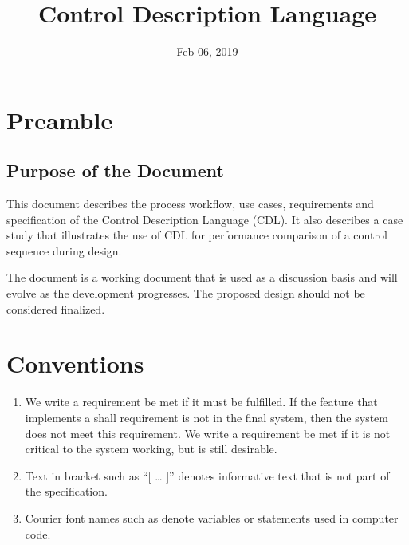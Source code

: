 \documentclass[letterpaper,10pt, openany,english]{sphinxmanual}
\title{Control Description Language}
\date{Feb 06, 2019}
\author{}
\begin{document}
\pagestyle{empty}
\sphinxmaketitle
\pagestyle{plain}
\sphinxtableofcontents
\pagestyle{normal}
\label{\detokenize{index::doc}}


\pagestyle{plain}


\chapter{Preamble}
\label{\detokenize{preample:preamble}}\label{\detokenize{preample::doc}}

\section{Purpose of the Document}
\label{\detokenize{preample:purpose-of-the-document}}
This document describes the process workflow,
use cases, requirements and
specification of the Control Description Language (CDL).
It also describes a case study that illustrates the use of CDL for
performance comparison of a control sequence during design.

The document is a working document that is used as a discussion basis
and will evolve as the development progresses. The proposed design
should not be considered finalized.


\chapter{Conventions}
\label{\detokenize{conventions:conventions}}\label{\detokenize{conventions:sec-conventions}}\label{\detokenize{conventions::doc}}\begin{enumerate}
\def\theenumi{\arabic{enumi}}
\def\labelenumi{\theenumi .}
\makeatletter\def\p@enumii{\p@enumi \theenumi .}\makeatother
\item {} 
We write a requirement  be met if it must be fulfilled.
If the feature that implements a shall requirement is not in the final system,
then the system does not meet this requirement.
We write a requirement  be met if it is not critical
to the system working, but is still desirable.

\item {} 
Text in bracket such as “{[} … {]}” denotes informative text that is
not part of the specification.

\item {} 
Courier font names such as  denote variables or statements used in computer code.

\end{enumerate}
\end{document}
